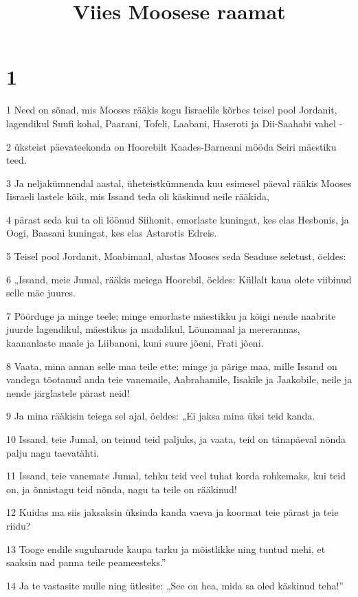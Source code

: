 

\title{Viies Moosese raamat}

\chapter{1}

\par 1 Need on sõnad, mis Mooses rääkis kogu Iisraelile kõrbes teisel pool Jordanit, lagendikul Suufi kohal, Paarani, Tofeli, Laabani, Haseroti ja Dii-Saahabi vahel -
\par 2 üksteist päevateekonda on Hoorebilt Kaades-Barneani mööda Seiri mäestiku teed.
\par 3 Ja neljakümnendal aastal, üheteistkümnenda kuu esimesel päeval rääkis Mooses Iisraeli lastele kõik, mis Issand teda oli käskinud neile rääkida,
\par 4 pärast seda kui ta oli löönud Siihonit, emorlaste kuningat, kes elas Hesbonis, ja Oogi, Baasani kuningat, kes elas Astarotis Edreis.
\par 5 Teisel pool Jordanit, Moabimaal, alustas Mooses seda Seaduse seletust, öeldes:
\par 6 „Issand, meie Jumal, rääkis meiega Hoorebil, öeldes: Küllalt kaua olete viibinud selle mäe juures.
\par 7 Pöörduge ja minge teele; minge emorlaste mäestikku ja kõigi nende naabrite juurde lagendikul, mäestikus ja madalikul, Lõunamaal ja mererannas, kaananlaste maale ja Liibanoni, kuni suure jõeni, Frati jõeni.
\par 8 Vaata, mina annan selle maa teile ette: minge ja pärige maa, mille Issand on vandega tõotanud anda teie vanemaile, Aabrahamile, Iisakile ja Jaakobile, neile ja nende järglastele pärast neid!
\par 9 Ja mina rääkisin teiega sel ajal, öeldes: „Ei jaksa mina üksi teid kanda.
\par 10 Issand, teie Jumal, on teinud teid paljuks, ja vaata, teid on tänapäeval nõnda palju nagu taevatähti.
\par 11 Issand, teie vanemate Jumal, tehku teid veel tuhat korda rohkemaks, kui teid on, ja õnnistagu teid nõnda, nagu ta teile on rääkinud!
\par 12 Kuidas ma siis jaksaksin üksinda kanda vaeva ja koormat teie pärast ja teie riidu?
\par 13 Tooge endile suguharude kaupa tarku ja mõistlikke ning tuntud mehi, et saaksin nad panna teile peameesteks.”
\par 14 Ja te vastasite mulle ning ütlesite: „See on hea, mida sa oled käskinud teha!”
